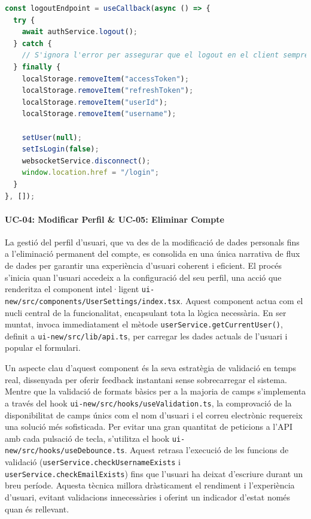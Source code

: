 \begin{lstlisting}[language=typescript, caption={Funció `logoutEndpoint` al hook `userAuth.tsx`}]
const logoutEndpoint = useCallback(async () => {
  try {
    await authService.logout();
  } catch {
    // S'ignora l'error per assegurar que el logout en el client sempre ocorri
  } finally {
    localStorage.removeItem("accessToken");
    localStorage.removeItem("refreshToken");
    localStorage.removeItem("userId");
    localStorage.removeItem("username");
    
    setUser(null);
    setIsLogin(false);
    websocketService.disconnect();
    window.location.href = "/login";
  }
}, []);
\end{lstlisting}

\paragraph{UC-04: Modificar Perfil \& UC-05: Eliminar Compte}
La gestió del perfil d'usuari, que va des de la modificació de dades personals fins a l'eliminació permanent del compte, es consolida en una única narrativa de flux de dades per garantir una experiència d'usuari coherent i eficient. El procés s'inicia quan l'usuari accedeix a la configuració del seu perfil, una acció que renderitza el component intel·ligent \texttt{ui-new/src/components/UserSettings/index.tsx}. Aquest component actua com el nucli central de la funcionalitat, encapsulant tota la lògica necessària. En ser muntat, invoca immediatament el mètode \texttt{userService.getCurrentUser()}, definit a \texttt{ui-new/src/lib/api.ts}, per carregar les dades actuals de l'usuari i popular el formulari.

Un aspecte clau d'aquest component és la seva estratègia de validació en temps real, dissenyada per oferir feedback instantani sense sobrecarregar el sistema. Mentre que la validació de formats bàsics per a la majoria de camps s'implementa a través del hook \texttt{ui-new/src/hooks/useValidation.ts}, la comprovació de la disponibilitat de camps únics com el nom d'usuari i el correu electrònic requereix una solució més sofisticada. Per evitar una gran quantitat de peticions a l'API amb cada pulsació de tecla, s'utilitza el hook \texttt{ui-new/src/hooks/useDebounce.ts}. Aquest retrasa l'execució de les funcions de validació (\texttt{userService.checkUsernameExists} i \texttt{userService.checkEmailExists}) fins que l'usuari ha deixat d'escriure durant un breu període. Aquesta tècnica millora dràsticament el rendiment i l'experiència d'usuari, evitant validacions innecessàries i oferint un indicador d'estat només quan és rellevant.

